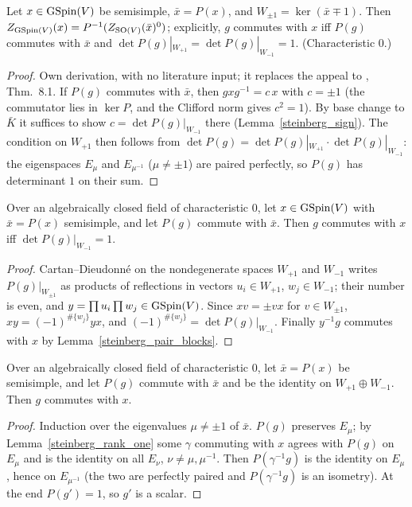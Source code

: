 \begin{theorem}
\label{steinberg_centralizer_connected}
\leanok
{}
Let $x\in\mathrm{GSpin}(V)$ be semisimple, $\bar x=P(x)$, and $W_{\pm1}=\ker(\bar x\mp 1)$. Then
$Z_{\mathrm{GSpin}(V)}(x)=P^{-1}(Z_{\mathrm{SO}(V)}(\bar x)^0)$; explicitly, $g$ commutes with $x$ iff $P(g)$
commutes with $\bar x$ and $\det P(g)|_{W_{+1}} = \det P(g)|_{W_{-1}} = 1$. (Characteristic $0$.)
\end{theorem}
\begin{proof}
\leanok
{}
Own derivation, with no literature input; it replaces the appeal to \cite{Steinberg}, Thm.~8.1.
If $P(g)$ commutes with $\bar x$, then $gxg^{-1}=c\,x$ with $c=\pm1$ (the commutator lies in $\ker P$, and the Clifford
norm gives $c^2=1$). By base change to $\bar K$ it suffices to show $c=\det P(g)|_{W_{-1}}$ there
(Lemma~\ref{steinberg_sign}). The condition on $W_{+1}$ then follows from
$\det P(g)=\det P(g)|_{W_{+1}}\cdot\det P(g)|_{W_{-1}}$: the eigenspaces $E_\mu$ and $E_{\mu^{-1}}$ ($\mu\neq\pm1$)
are paired perfectly, so $P(g)$ has determinant $1$ on their sum.
\end{proof}

\begin{lemma}
\label{steinberg_sign}
\leanok
{}
Over an algebraically closed field of characteristic $0$, let $x\in\mathrm{GSpin}(V)$ with $\bar x=P(x)$ semisimple, and let $P(g)$
commute with $\bar x$. Then $g$ commutes with $x$ iff $\det P(g)|_{W_{-1}}=1$.
\end{lemma}
\begin{proof}
\leanok
{}
Cartan--Dieudonn\'e on the nondegenerate spaces $W_{+1}$ and $W_{-1}$ writes $P(g)|_{W_{\pm1}}$ as products of reflections
in vectors $u_i\in W_{+1}$, $w_j\in W_{-1}$; their number is even, and $y=\prod u_i\prod w_j\in\mathrm{GSpin}(V)$. Since $xv=\pm vx$
for $v\in W_{\pm1}$, $xy=(-1)^{\#\{w_j\}}yx$, and $(-1)^{\#\{w_j\}}=\det P(g)|_{W_{-1}}$. Finally $y^{-1}g$ commutes with $x$
by Lemma~\ref{steinberg_pair_blocks}.
\end{proof}

\begin{lemma}
\label{steinberg_pair_blocks}
\leanok
{}
Over an algebraically closed field of characteristic $0$, let $\bar x=P(x)$ be semisimple, and let $P(g)$ commute with
$\bar x$ and be the identity on $W_{+1}\oplus W_{-1}$. Then $g$ commutes with $x$.
\end{lemma}
\begin{proof}
\leanok
{}
Induction over the eigenvalues $\mu\neq\pm1$ of $\bar x$. $P(g)$ preserves $E_\mu$; by Lemma~\ref{steinberg_rank_one} some
$\gamma$ commuting with $x$ agrees with $P(g)$ on $E_\mu$ and is the identity on all $E_\nu$, $\nu\neq\mu,\mu^{-1}$.
Then $P(\gamma^{-1}g)$ is the identity on $E_\mu$, hence on $E_{\mu^{-1}}$ (the two are perfectly paired and $P(\gamma^{-1}g)$ is an
isometry). At the end $P(g')=1$, so $g'$ is a scalar.
\end{proof}

